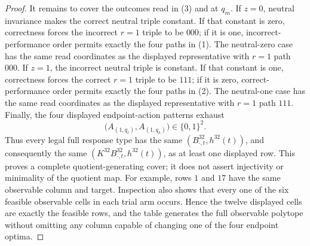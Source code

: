 \documentclass{article}
\begin{document}
\begin{proof}
It remains to cover the outcomes read in (3) and at \(q_m\).  If \(z=0\), neutral invariance makes the correct neutral triple constant.  If that constant is zero, correctness forces the incorrect \(r=1\) triple to be \(000\); if it is one, incorrect-performance order permits exactly the four paths in (1).  The neutral-zero case has the same read coordinates as the displayed representative with \(r=1\) path \(000\).  If \(z=1\), the incorrect neutral triple is constant.  If that constant is one, correctness forces the correct \(r=1\) triple to be \(111\); if it is zero, correct-performance order permits exactly the four paths in (2).  The neutral-one case has the same read coordinates as the displayed representative with \(r=1\) path \(111\).  Finally, the four displayed endpoint-action patterns exhaust
\[
\bigl(A_{(1,q_\ell)},A_{(1,q_h)}\bigr)\in\{0,1\}^2.
\tag{4}
\]
Thus every legal full response type has the same \((B^{32}_{\cdot,t},h^{32}(t))\), and consequently the same \((K^{32}B^{32}_{\cdot,t},h^{32}(t))\), as at least one displayed row.  This proves a complete quotient-generating cover; it does not assert injectivity or minimality of the quotient map.  For example, rows \(1\) and \(17\) have the same observable column and target.  Inspection also shows that every one of the six feasible observable cells in each trial arm occurs.  Hence the twelve displayed cells are exactly the feasible rows, and the table generates the full observable polytope without omitting any column capable of changing one of the four endpoint optima.


\end{proof}
\end{document}
